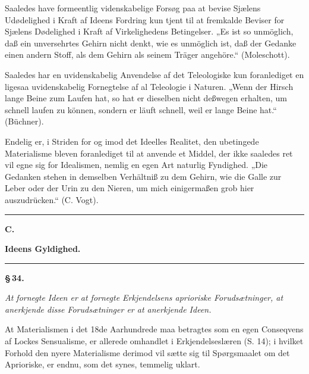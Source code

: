 \documentclass[12pt]{book}
\newcommand{\opage}[1]{\marginnote{\footnotesize\textit{[#1]}}}
\begin{document}
Saaledes have formeentlig videnskabelige Forsøg paa at bevise Sjælens Udødelighed i Kraft af Ideens
Fordring kun tjent til at fremkalde Beviser for Sjælens Dødelighed i Kraft af Virkelighedens
Betingelser. „Es ist so unmöglich, daß ein unversehrtes Gehirn nicht denkt, wie es unmöglich ist, daß
der Gedanke einen andern Stoff, als dem Gehirn als seinem Träger angehöre.“ (Moleschott).

Saaledes har en uvidenskabelig Anvendelse af det Teleologiske kun foranlediget en ligesaa
uvidenskabelig Fornegtelse af al Teleologie i Naturen. „Wenn der Hirsch lange Beine zum Laufen hat,
so hat er dieselben nicht deßwegen
\opage{178} erhalten, um schnell laufen zu können, sondern er läuft schnell, weil er lange Beine hat.“
(Büchner).

Endelig er, i Striden for og imod det Ideelles Realitet, den ubetingede Materialisme bleven
foranlediget til at anvende et Middel, der ikke saaledes ret vil egne sig for Idealismen, nemlig en
egen Art naturlig Fyndighed. „Die Gedanken stehen in demselben Verhältniß zu dem Gehirn, wie die
Galle zur Leber oder der Urin zu den Nieren, um mich einigermaßen grob hier
auszudrücken.“ (C. Vogt).

\begin{center}\rule{0.35\linewidth}{0.4pt}\end{center}

\begin{center}
  {\large\bfseries C.}\par\vspace{2pt}
  {\bfseries Ideens Gyldighed.}\par\vspace{4pt}
  \rule{2cm}{0.4pt}
\end{center}
{}

\begin{center}{\bfseries \S\,34.}\end{center}

\emph{At fornegte Ideen er at fornegte Erkjendelsens aprioriske Forudsætninger, at anerkjende disse
Forudsætninger er at anerkjende Ideen.}

At Materialismen i det 18de Aarhundrede maa betragtes som en egen Conseqvens af Lockes Sensualisme,
er allerede omhandlet i Erkjendelseslæren (S. 14); i hvilket Forhold den nyere Materialisme derimod
vil sætte sig til Spørgsmaalet om det Aprioriske, er endnu, som det synes, temmelig uklart.
\end{document}
